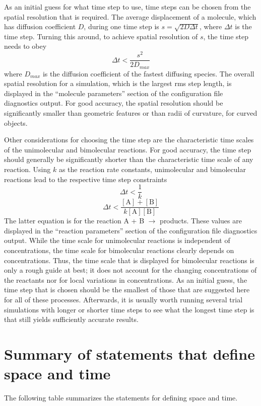 \documentclass {scrbook}
\begin{document}
As an initial guess for what time step to use, time steps can be chosen from the spatial resolution that is required. The average displacement of a molecule, which has diffusion coefficient $D$, during one time step is $s = \sqrt{2D \Delta t}$, where $\Delta t$ is the time step. Turning this around, to achieve spatial resolution of $s$, the time step needs to obey
$$\Delta t < \frac{s^2}{2D_{max}}$$
where $D_{max}$ is the diffusion coefficient of the fastest diffusing species. The overall spatial resolution for a simulation, which is the largest rms step length, is displayed in the ``molecule parameters'' section of the configuration file diagnostics output. For good accuracy, the spatial resolution should be significantly smaller than geometric features or than radii of curvature, for curved objects.

Other considerations for choosing the time step are the characteristic time scales of the unimolecular and bimolecular reactions. For good accuracy, the time step should generally be significantly shorter than the characteristic time scale of any reaction. Using $k$ as the reaction rate constants, unimolecular and bimolecular reactions lead to the respective time step constraints
$$\Delta t < \frac{1}{k}$$
$$\Delta t < \frac{[\textrm{A}]+[\textrm{B}]}{k[\textrm{A}][\textrm{B}]}$$
The latter equation is for the reaction A + B $\rightarrow$ products. These values are displayed in the ``reaction parameters'' section of the configuration file diagnostics output. While the time scale for unimolecular reactions is independent of concentrations, the time scale for bimolecular reactions clearly depends on concentrations. Thus, the time scale that is displayed for bimolecular reactions is only a rough guide at best; it does not account for the changing concentrations of the reactants nor for local variations in concentrations.
As an initial guess, the time step that is chosen should be the smallest of those that are suggested here for all of these processes. Afterwards, it is usually worth running several trial simulations with longer or shorter time steps to see what the longest time step is that still yields sufficiently accurate results.

\section{Summary of statements that define space and time}

The following table summarizes the statements for defining space and time.
\end{document}
